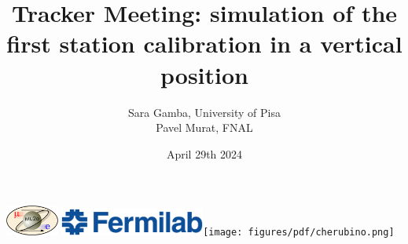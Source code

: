\documentclass{beamer}[10pt]
\title[VST]{
  {
    {Tracker Meeting: simulation of the first station calibration in a vertical position} }
}
\author[Sara Gamba]{
  \fontseries{s}
  \selectfont
  { Sara Gamba, University of Pisa \\ Pavel Murat, FNAL}
}
\date{April 29th 2024}
\begin{document}
% 
% 



\begin{frame}
\centering
\includegraphics[height=1cm]{figures/png/mu2e_logo_oval.png}
\titlepage
\centering
\includegraphics[height=0.9cm]{figures/png/FNAL-Logo-NAL-Blue.png}\hspace{10mm}\texttt{[image: figures/pdf/cherubino.png]}

\end{frame}
\end{document}
